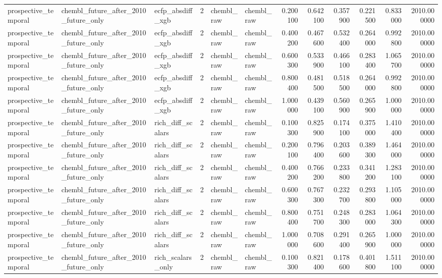 \begin{longtable}{lllrllrrrrrr}
prospective\_temporal & chembl\_future\_after\_2010\_future\_only & ecfp\_absdiff\_xgb & 2 & chembl\_raw & chembl\_raw & 0.200100 & 0.642100 & 0.357900 & 0.221500 & 0.833000 & 2010.000000 \\
prospective\_temporal & chembl\_future\_after\_2010\_future\_only & ecfp\_absdiff\_xgb & 2 & chembl\_raw & chembl\_raw & 0.400200 & 0.467600 & 0.532400 & 0.264000 & 0.992800 & 2010.000000 \\
prospective\_temporal & chembl\_future\_after\_2010\_future\_only & ecfp\_absdiff\_xgb & 2 & chembl\_raw & chembl\_raw & 0.600300 & 0.533900 & 0.466100 & 0.283400 & 1.065700 & 2010.000000 \\
prospective\_temporal & chembl\_future\_after\_2010\_future\_only & ecfp\_absdiff\_xgb & 2 & chembl\_raw & chembl\_raw & 0.800400 & 0.481500 & 0.518500 & 0.264000 & 0.992800 & 2010.000000 \\
prospective\_temporal & chembl\_future\_after\_2010\_future\_only & ecfp\_absdiff\_xgb & 2 & chembl\_raw & chembl\_raw & 1.000000 & 0.439100 & 0.560900 & 0.265900 & 1.000000 & 2010.000000 \\
prospective\_temporal & chembl\_future\_after\_2010\_future\_only & rich\_diff\_scalars & 2 & chembl\_raw & chembl\_raw & 0.100300 & 0.825900 & 0.174100 & 0.375000 & 1.410400 & 2010.000000 \\
prospective\_temporal & chembl\_future\_after\_2010\_future\_only & rich\_diff\_scalars & 2 & chembl\_raw & chembl\_raw & 0.200100 & 0.796400 & 0.203600 & 0.389300 & 1.464000 & 2010.000000 \\
prospective\_temporal & chembl\_future\_after\_2010\_future\_only & rich\_diff\_scalars & 2 & chembl\_raw & chembl\_raw & 0.400200 & 0.766200 & 0.233800 & 0.341200 & 1.283100 & 2010.000000 \\
prospective\_temporal & chembl\_future\_after\_2010\_future\_only & rich\_diff\_scalars & 2 & chembl\_raw & chembl\_raw & 0.600300 & 0.767300 & 0.232700 & 0.293800 & 1.105000 & 2010.000000 \\
prospective\_temporal & chembl\_future\_after\_2010\_future\_only & rich\_diff\_scalars & 2 & chembl\_raw & chembl\_raw & 0.800400 & 0.751700 & 0.248300 & 0.283000 & 1.064300 & 2010.000000 \\
prospective\_temporal & chembl\_future\_after\_2010\_future\_only & rich\_diff\_scalars & 2 & chembl\_raw & chembl\_raw & 1.000000 & 0.708600 & 0.291400 & 0.265900 & 1.000000 & 2010.000000 \\
prospective\_temporal & chembl\_future\_after\_2010\_future\_only & rich\_scalars\_only & 2 & chembl\_raw & chembl\_raw & 0.100300 & 0.821400 & 0.178600 & 0.401800 & 1.511100 & 2010.000000 \\

\end{longtable}
